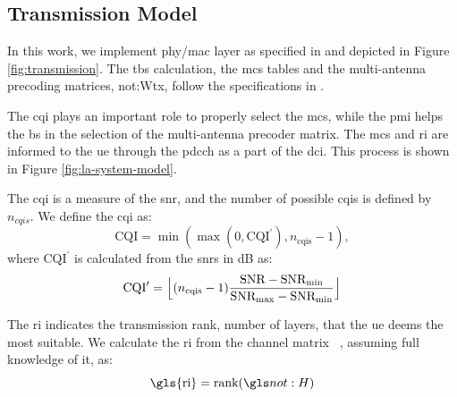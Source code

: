 \subsection{Transmission Model}

%
In this work, we implement \gls{phy}/\gls{mac} layer as specified in \cite{3gpp.38.212} and depicted in Figure \ref{fig:transmission}.
%
%
The \gls{tbs} calculation, the \gls{mcs} tables and the multi-antenna precoding matrices, \gls{not:Wtx}, follow the specifications in \cite{3gpp.38.214}.
%


The \gls{cqi} plays an important role to properly select the \gls{mcs}, while the \gls{pmi} helps the \gls{bs} in the selection of the multi-antenna precoder matrix.
%
The \gls{mcs} and \gls{ri} are informed to the \gls{ue} through the \gls{pdcch} as a part of the \gls{dci}.
%
This process is shown in Figure \ref{fig:la-system-model}.


The \gls{cqi} is a measure of the \gls{snr}, and the number of possible \gls{cqi}s is defined by $n_{cqis}$. We define the \gls{cqi} as:
\begin{equation}\label{eq:cqi}
\textrm{CQI} = \min{
	(\max {(0, \textrm{CQI}^{\prime} ) }, n_{\text{cqis}} - 1)},
\end{equation}
%
\noindent where $\textrm{CQI}^{\prime}$ is calculated from the \gls{snr}s in dB as:
\begin{equation}\label{eq:cqi_prime}
\textrm{CQI}^{\prime} = \floor[\Big]{(n_{\text{cqis}}-1)\frac{\textrm{SNR} - \textrm{SNR}_{\text{min}}}{\textrm{SNR}_{\text{max}}-\textrm{SNR}_{\text{min}}}}
\end{equation}


The \gls{ri} indicates the transmission rank, number of layers, that the \gls{ue} deems the most suitable.
%
We calculate the \gls{ri} from the channel matrix \channel~, assuming full knowledge of it, as:
%
\begin{equation}\label{eq:la-rank}
    \textrm{\gls{ri}} = \textrm{rank} (\channel)
\end{equation}

